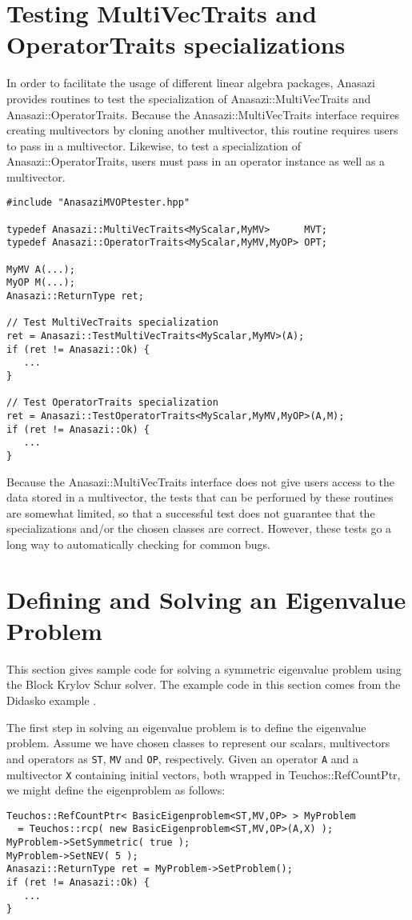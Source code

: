\section{Testing MultiVecTraits and OperatorTraits specializations}
\label{sec:anasazi:MVOPtester}

In order to facilitate the usage of different linear algebra packages, Anasazi
provides routines to test the specialization of Anasazi::MultiVecTraits and
Anasazi::OperatorTraits. Because the Anasazi::MultiVecTraits interface requires
creating multivectors by cloning another multivector, this routine requires 
users to pass in a multivector. Likewise, to test a specialization of
Anasazi::OperatorTraits, users must pass in an operator instance as well as a
multivector.
\begin{verbatim}
#include "AnasaziMVOPtester.hpp"

typedef Anasazi::MultiVecTraits<MyScalar,MyMV>      MVT;
typedef Anasazi::OperatorTraits<MyScalar,MyMV,MyOP> OPT;

MyMV A(...);
MyOP M(...);
Anasazi::ReturnType ret;

// Test MultiVecTraits specialization
ret = Anasazi::TestMultiVecTraits<MyScalar,MyMV>(A);
if (ret != Anasazi::Ok) {
   ...
}

// Test OperatorTraits specialization
ret = Anasazi::TestOperatorTraits<MyScalar,MyMV,MyOP>(A,M);
if (ret != Anasazi::Ok) {
   ...
}
\end{verbatim}

Because the Anasazi::MultiVecTraits interface does not give users access to the
data stored in a multivector, the tests that can be performed by these routines
are somewhat limited, so that a successful test does not guarantee that the
specializations and/or the chosen classes are correct. However, these tests go a
long way to automatically checking for common bugs.

\section{Defining and Solving an Eigenvalue Problem}
\label{sec:anasazi:example}

This section gives sample code for solving a symmetric eigenvalue problem using
the Block Krylov Schur solver. The example code in this section comes from the
Didasko example .

The first step in solving an eigenvalue problem is to define the eigenvalue
problem. Assume we have chosen classes to represent our scalars, multivectors
and operators as \verb!ST!, \verb!MV! and \verb!OP!, respectively. Given an
operator \verb!A! and a multivector \verb!X! containing initial vectors, both
wrapped in Teuchos::RefCountPtr, we might define the eigenproblem as
follows:
\begin{verbatim}
Teuchos::RefCountPtr< BasicEigenproblem<ST,MV,OP> > MyProblem 
  = Teuchos::rcp( new BasicEigenproblem<ST,MV,OP>(A,X) );
MyProblem->SetSymmetric( true );
MyProblem->SetNEV( 5 );
Anasazi::ReturnType ret = MyProblem->SetProblem();
if (ret != Anasazi::Ok) {
   ...
}
\end{verbatim}


